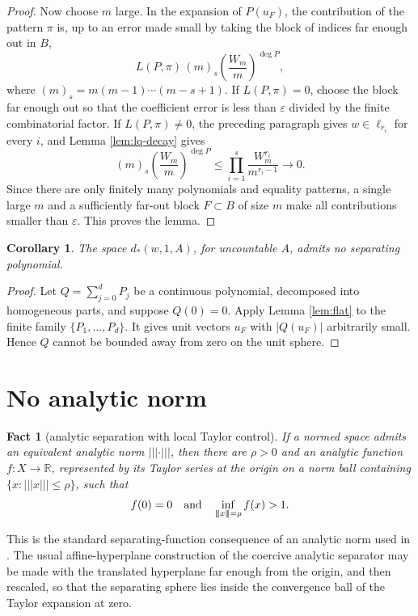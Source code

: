 \documentclass[11pt]{article}
\newtheorem{fact}{Fact}
\newtheorem{corollary}{Corollary}
\newcommand{\R}{\mathbb R}
\newcommand{\eps}{\varepsilon}
\newcommand{\vertiii}[1]{|\!|\!|#1|\!|\!|}
\begin{document}
\begin{proof}
Now choose \(m\) large.  In the expansion of \(P(u_F)\), the contribution of
the pattern \(\pi\) is, up to an error made small by taking the block of
indices far enough out in \(B\),
\[
  L(P,\pi)\,(m)_s\left(\frac{W_m}{m}\right)^{\deg P},
\]
where \((m)_s=m(m-1)\cdots(m-s+1)\).  If \(L(P,\pi)=0\), choose the block far
enough out so that the coefficient error is less than
\(\eps\) divided by the finite combinatorial factor.  If \(L(P,\pi)\ne0\),
the preceding paragraph gives \(w\in\ell_{r_i}\) for every \(i\), and Lemma
\ref{lem:lq-decay} gives
\[
  (m)_s\left(\frac{W_m}{m}\right)^{\deg P}
  \le
  \prod_{i=1}^s \frac{W_m^{r_i}}{m^{r_i-1}}
  \longrightarrow0 .
\]
Since there are only finitely many polynomials and equality patterns, a single
large \(m\) and a sufficiently far-out block \(F\subset B\) of size \(m\)
make all contributions smaller than \(\eps\).  This proves the lemma.
\end{proof}

\begin{corollary}\label{cor:no-separating-polynomial}
The space \(d_*(w,1,A)\), for uncountable \(A\), admits no separating
polynomial.
\end{corollary}

\begin{proof}
Let \(Q=\sum_{j=0}^d P_j\) be a continuous polynomial, decomposed into
homogeneous parts, and suppose \(Q(0)=0\).  Apply Lemma \ref{lem:flat} to the
finite family \(\{P_1,\ldots,P_d\}\).  It gives unit vectors \(u_F\) with
\(|Q(u_F)|\) arbitrarily small.  Hence \(Q\) cannot be bounded away from zero
on the unit sphere.
\end{proof}

\section{No analytic norm}

\begin{fact}[analytic separation with local Taylor control]\label{fact:sep}
If a normed space admits an equivalent analytic norm
\(\vertiii{\cdot}\), then there are \(\rho>0\) and an analytic function
\(f\colon X\to\R\), represented by its Taylor series at the origin on a norm
ball containing \(\{x:\vertiii{x}\le\rho\}\), such that
\[
  f(0)=0
  \quad\hbox{and}\quad
  \inf_{\vertiii{x}=\rho} f(x)>1 .
\]
\end{fact}

This is the standard separating-function consequence of an analytic norm used
in \cite{dantas-hajek-russo}.  The usual affine-hyperplane construction of
the coercive analytic separator may be made with the translated hyperplane far
enough from the origin, and then rescaled, so that the separating sphere lies
inside the convergence ball of the Taylor expansion at zero.
\end{document}
